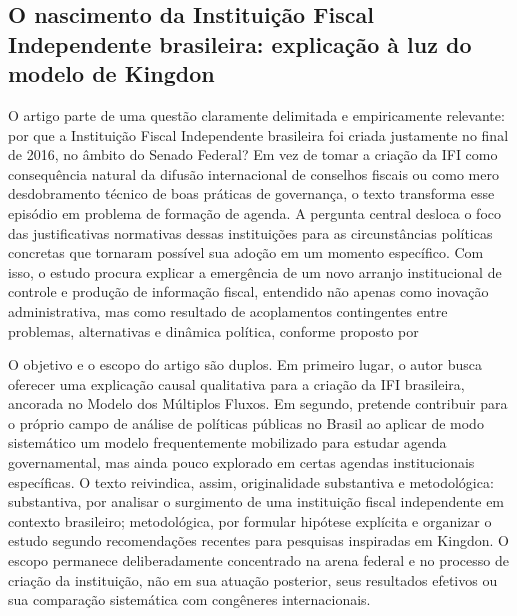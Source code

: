 \documentclass[12pt,a4paper]{article}
\begin{document}
\subsection{O nascimento da Instituição Fiscal Independente brasileira: explicação à luz do modelo de Kingdon}
\label{sec:org32f37f8}

O artigo parte de uma questão claramente delimitada e empiricamente relevante: por que a Instituição Fiscal Independente brasileira foi criada justamente no final de 2016, no âmbito do Senado Federal? Em vez de tomar a criação da IFI como consequência natural da difusão internacional de conselhos fiscais ou como mero desdobramento técnico de boas práticas de governança, o texto transforma esse episódio em problema de formação de agenda. A pergunta central desloca o foco das justificativas normativas dessas instituições para as circunstâncias políticas concretas que tornaram possível sua adoção em um momento específico. Com isso, o estudo procura explicar a emergência de um novo arranjo institucional de controle e produção de informação fiscal, entendido não apenas como inovação administrativa, mas como resultado de acoplamentos contingentes entre problemas, alternativas e dinâmica política, conforme proposto por\parencite{anonsd_sem_titulo}

O objetivo e o escopo do artigo são duplos. Em primeiro lugar, o autor busca oferecer uma explicação causal qualitativa para a criação da IFI brasileira, ancorada no Modelo dos Múltiplos Fluxos. Em segundo, pretende contribuir para o próprio campo de análise de políticas públicas no Brasil ao aplicar de modo sistemático um modelo frequentemente mobilizado para estudar agenda governamental, mas ainda pouco explorado em certas agendas institucionais específicas. O texto reivindica, assim, originalidade substantiva e metodológica: substantiva, por analisar o surgimento de uma instituição fiscal independente em contexto brasileiro; metodológica, por formular hipótese explícita e organizar o estudo segundo recomendações recentes para pesquisas inspiradas em Kingdon. O escopo permanece deliberadamente concentrado na arena federal e no processo de criação da instituição, não em sua atuação posterior, seus resultados efetivos ou sua comparação sistemática com congêneres internacionais.\parencite{anonsd_sem_titulo}
\end{document}
